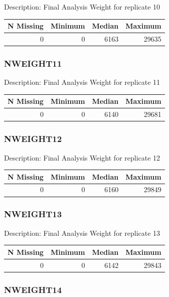 \documentclass[
]{krantz}
\begin{document}
Description: Final Analysis Weight for replicate 10

\begin{tabular}[t]{r|r|r|r}
\hline
N Missing & Minimum & Median & Maximum\\
\hline
0 & 0 & 6163 & 29635\\
\hline
\end{tabular}

\hypertarget{nweight11}{%
\subsubsection*{NWEIGHT11}\label{nweight11}}


Description: Final Analysis Weight for replicate 11

\begin{tabular}[t]{r|r|r|r}
\hline
N Missing & Minimum & Median & Maximum\\
\hline
0 & 0 & 6140 & 29681\\
\hline
\end{tabular}

\hypertarget{nweight12}{%
\subsubsection*{NWEIGHT12}\label{nweight12}}


Description: Final Analysis Weight for replicate 12

\begin{tabular}[t]{r|r|r|r}
\hline
N Missing & Minimum & Median & Maximum\\
\hline
0 & 0 & 6160 & 29849\\
\hline
\end{tabular}

\hypertarget{nweight13}{%
\subsubsection*{NWEIGHT13}\label{nweight13}}


Description: Final Analysis Weight for replicate 13

\begin{tabular}[t]{r|r|r|r}
\hline
N Missing & Minimum & Median & Maximum\\
\hline
0 & 0 & 6142 & 29843\\
\hline
\end{tabular}

\hypertarget{nweight14}{%
\subsubsection*{NWEIGHT14}\label{nweight14}}
\end{document}
